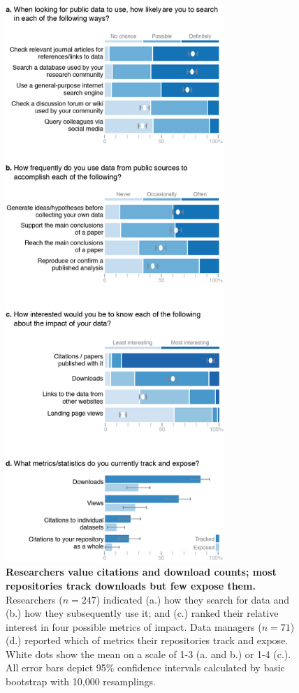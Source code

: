 \documentclass[english]{article}
\begin{document}

\begin{figure}[!ht]
\begin{center}
\includegraphics[width=3.25in]{MDC_Figure.png}
\end{center}
\caption{
{\bf Researchers value citations and download counts; most repositories track downloads but few expose them.}
Researchers ($n=247$) indicated (a.) how they search for data and (b.) how they subsequently use it; and (c.) ranked their relative interest in four possible metrics of impact.
Data managers ($n=71$) (d.) reported which of metrics their repositories track and expose.
White dots show the mean on a scale of 1-3 (a. and b.) or 1-4 (c.).
All error bars depict 95\% confidence intervals calculated by basic bootstrap with 10,000 resamplings. 
}
\label{fig:results}
\end{figure}
\end{document}
